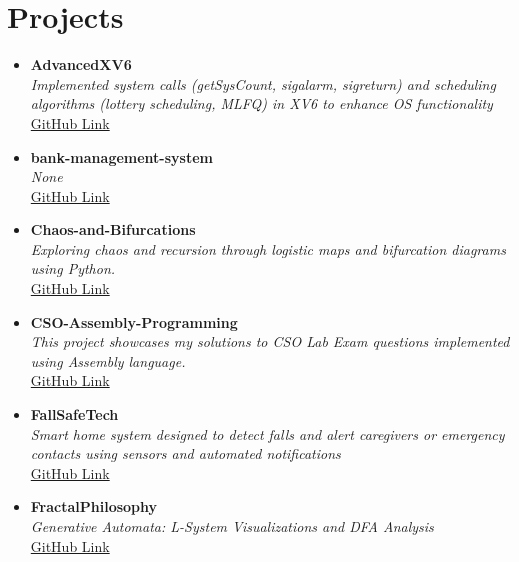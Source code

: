 \section{\textbf{Projects}}
\vspace{-1mm}
\begin{itemize}[leftmargin=5mm, label={\small\textbullet}]
    \item \textbf{AdvancedXV6} \\ 
    \textit{Implemented system calls (getSysCount, sigalarm, sigreturn) and scheduling algorithms (lottery scheduling, MLFQ) in XV6 to enhance OS functionality} \\ 
    \href{https://github.com/shreyasMehta05/AdvancedXV6}{GitHub Link} \
    
    \item \textbf{bank-management-system} \\ 
    \textit{None} \\ 
    \href{https://github.com/shreyasMehta05/bank-management-system}{GitHub Link} \
    
    \item \textbf{Chaos-and-Bifurcations} \\ 
    \textit{Exploring chaos and recursion through logistic maps and bifurcation diagrams using Python.} \\ 
    \href{https://github.com/shreyasMehta05/Chaos-and-Bifurcations}{GitHub Link} \
    
    \item \textbf{CSO-Assembly-Programming} \\ 
    \textit{This project showcases my solutions to CSO Lab Exam questions implemented using Assembly language.} \\ 
    \href{https://github.com/shreyasMehta05/CSO-Assembly-Programming}{GitHub Link} \
    
    \item \textbf{FallSafeTech} \\ 
    \textit{Smart home system designed to detect falls and alert caregivers or emergency contacts using sensors and automated notifications} \\ 
    \href{https://github.com/shreyasMehta05/FallSafeTech}{GitHub Link} \
    
    \item \textbf{FractalPhilosophy} \\ 
    \textit{Generative Automata: L-System Visualizations and DFA Analysis} \\ 
    \href{https://github.com/shreyasMehta05/FractalPhilosophy}{GitHub Link} \
    

\end{itemize}
